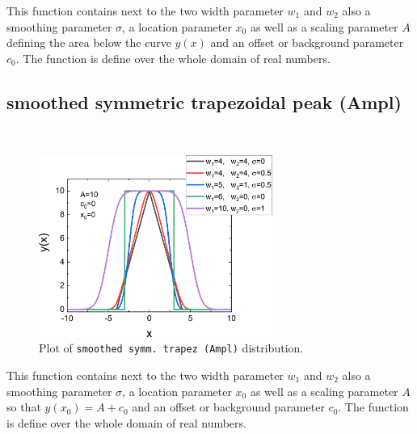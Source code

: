 This function contains next to the two width parameter $w_1$ and $w_2$ also a smoothing parameter $\sigma$, a location parameter $x_0$ as well as a scaling parameter $A$ defining the area below the curve $y(x)$ and an offset or background parameter $c_0$. The function is define over the whole domain of real numbers.

\subsection{smoothed symmetric trapezoidal peak (Ampl)} ~\\

\begin{figure}[htb]
\begin{center}
\includegraphics[width=0.6824\textwidth]{../images/peaks/trapez/smoothedtrapezAmpl.png}
\end{center}
\caption{Plot of \texttt{smoothed symm.\ trapez (Ampl)} distribution.}
\label{fig:smoothedsymmtrapeztAmpl}
\end{figure}

This function contains next to the two width parameter $w_1$ and $w_2$ also a smoothing parameter $\sigma$, a location parameter $x_0$ as well as a scaling parameter $A$ so that $y(x_0)=A+c_0$ and an offset or background parameter $c_0$. The function is define over the whole domain of real numbers.

\clearpage
